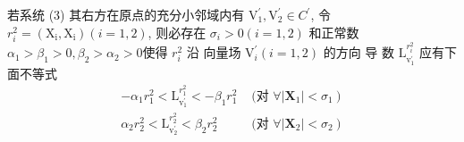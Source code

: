 \documentclass[12pt,a4paper,UTF8]{ctexart}
\begin{document}
若系统 (3) 其右方在原点的充分小邻域内有  $\mathrm{V}_{1}^{\prime}, \mathrm{V}_{2}^{\prime} \in C^{\prime} $, 令  $r_{i}^{2}=\left(\mathrm{X}_{\mathrm{i}}\right. ,  \left.\mathrm{X}_{\mathrm{i}}\right)(i=1,2) $, 则必存在  $\sigma_{i}>0(i=1,2)$  和正常数 $ \alpha_{1}>\beta_{1}>0,\beta_{2}>\alpha_{2}>0  $使得 $ r_{i}^{2}$  沿 向量场 $ \mathrm{V}_{i}^{\prime}(i=1,2) $ 的方向 导 数 $ \mathrm{L}_{\mathrm{v}_{1}^{\prime}}^{r_{i}^{2}} $ 应有下面不等式
\begin{equation*}
	\begin{array}{ll}
		-\alpha_{1} r_{1}^{2}<\mathrm{L}_{\mathrm{v}_{1}^{\prime}}^{r_{1}^{2}}<-\beta_{1} r_{1}^{2} & \text { (对 } \left.\forall \left|\mathbf{X}_{1}\right|<\sigma_{1}\right)\\
		\alpha_{2} r_{2}^{2}<\mathrm{L}_{\mathrm{v}_{2}^{\prime}}^{r_{2}^{2}}<\beta_{2} r_{2}^{2} & \text { (对 } \left.\forall \left|\mathbf{X}_{2}\right|<\sigma_{2}\right)
	\end{array}
\end{equation*}
	
\end{document}
